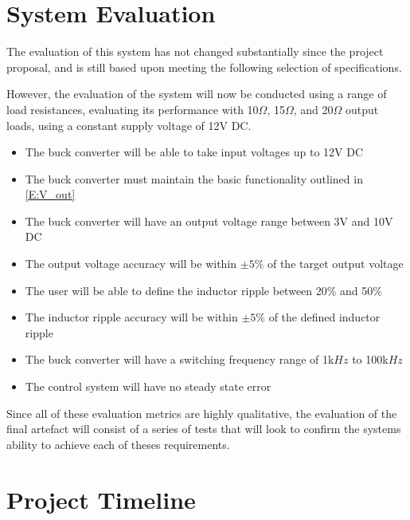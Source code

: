 \section{System Evaluation}


    The evaluation of this system has not changed substantially since the project proposal, and is still based upon meeting the following selection of specifications. 
    
    However, the evaluation of the system will now be conducted using a range of load resistances, evaluating its performance with 10$\Omega$, 15$\Omega$, and 20$\Omega$ output loads, using a constant supply voltage of 12V DC.

\begin{itemize}
	\item The buck converter will be able to take input voltages up to 12V DC
	
	\item The buck converter must maintain the basic functionality outlined in \cref{E:V_out}

	\item The buck converter will have an output voltage range between 3V and 10V DC
	
	\item The output voltage accuracy will be within $\pm 5\%$ of the target output voltage

	\item The user will be able to define the inductor ripple between 20\% and 50\%
	
	\item The inductor ripple accuracy will be within $\pm 5\%$ of the defined inductor ripple
	
	\item The buck converter will have a switching frequency range of 1k$Hz$ to 100k$Hz$

	\item The control system will have no steady state error

\end{itemize}

Since all of these evaluation metrics are highly qualitative, the evaluation of the final artefact will consist of a series of tests that will look to confirm the systems ability to achieve each of theses requirements.  

\section{Project Timeline}

